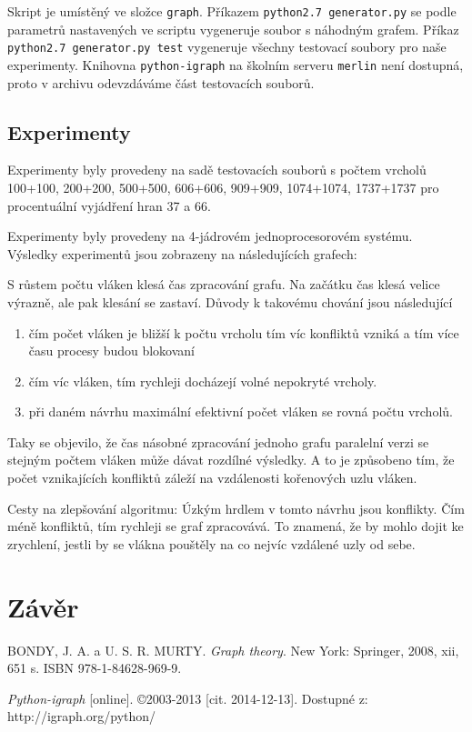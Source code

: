 \documentclass[a4paper, 11pt, titlepage, final]{article}[3. prosinec 2011]
\begin{document}
Skript je umístěný ve složce \texttt{graph}. Příkazem \texttt{python2.7 generator.py} se podle parametrů nastavených ve scriptu vygeneruje soubor s náhodným grafem. Příkaz \texttt{python2.7 generator.py test} vygeneruje všechny testovací soubory pro naše experimenty. Knihovna \texttt{python-igraph} na školním serveru \texttt{merlin} není dostupná, proto v archivu odevzdáváme část testovacích souborů.

\subsection{Experimenty}

Experimenty byly provedeny na sadě testovacích souborů s počtem vrcholů 100+100, 200+200, 500+500, 606+606, 909+909, 1074+1074, 1737+1737 pro procentuální vyjádření hran 37 a 66.

Experimenty byly provedeny na 4-jádrovém jednoprocesorovém systému.
Výsledky experimentů jsou zobrazeny na následujících grafech:

S růstem počtu vláken klesá čas zpracování grafu. Na začátku čas klesá velice výrazně, ale pak klesání se zastaví. Důvody k takovému chování jsou následující
\begin{enumerate}
\item čím počet vláken je bližší k počtu vrcholu tím víc konfliktů vzniká a tím více času procesy budou blokovaní
\item čím víc vláken, tím rychleji docházejí volné nepokryté vrcholy.
\item při daném návrhu maximální efektivní počet vláken se rovná počtu vrcholů.
\end{enumerate}

Taky se objevilo, že čas násobné zpracování jednoho grafu paralelní verzi se stejným počtem vláken může dávat rozdílné výsledky. A to je způsobeno tím, že počet vznikajících konfliktů záleží na vzdálenosti kořenových uzlu vláken.

Cesty na zlepšování algoritmu:
    Úzkým hrdlem v tomto návrhu jsou konflikty. Čím méně konfliktů, tím rychleji se graf zpracovává. To znamená, že by mohlo dojit ke zrychlení, jestli by se vlákna pouštěly na co nejvíc vzdálené uzly od sebe.

\section{Závěr}

\begin{thebibliography}{1}
  
   BONDY, J. A. a U. S. R. MURTY. \emph{Graph theory}. New York: Springer, 2008, xii, 651 s. ISBN 978-1-84628-969-9. 
  
   \emph{Python-igraph} [online]. \copyright 2003-2013 [cit. 2014-12-13]. Dostupné z: http://igraph.org/python/ 

\end{thebibliography}


\end{document}
